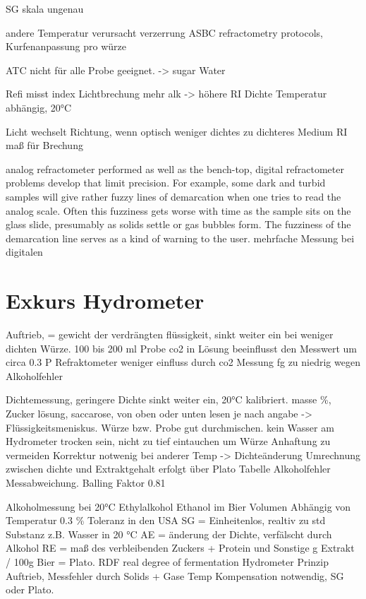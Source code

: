 \documentclass[a4paper,parskip=half]{scrartcl}
\begin{document}
SG skala ungenau
\autocite{Terrill2011}

andere Temperatur verursacht verzerrung
ASBC refractometry protocols, Kurfenanpassung pro würze
\autocite{Bonham2001}

ATC nicht
für alle Probe geeignet. -> sugar Water
\autocite{Depalma2017}

Refi misst index Lichtbrechung
mehr alk -> höhere RI
Dichte Temperatur abhängig, 20°C
\autocite{Gossett2012}

Licht wechselt Richtung, wenn optisch weniger dichtes zu dichteres Medium
RI maß für Brechung

\autocite{Spedding2016}

analog refractometer performed as well as the bench-top, digital refractometer
problems develop that limit precision.  For example, some dark and turbid samples will give rather fuzzy lines of demarcation when one tries to read the analog scale.  Often this fuzziness gets worse with time as the sample sits on the glass slide, presumably as solids settle or gas bubbles form.  The fuzziness of the demarcation line serves as a kind of warning to the user. 
mehrfache Messung bei digitalen
\autocite{Gossett2012a}

\section*{Exkurs Hydrometer}

Auftrieb, = gewicht der verdrängten flüssigkeit, sinkt weiter
ein bei weniger dichten Würze.
100 bis 200 ml Probe
co2 in Lösung beeinflusst den Messwert um circa 0.3 P
Refraktometer weniger einfluss durch co2
Messung fg zu niedrig wegen Alkoholfehler
\autocite{Novotny2017}

Dichtemessung, geringere Dichte sinkt weiter ein, 20°C kalibriert.
masse \%, Zucker lösung, saccarose, von oben oder unten lesen je
nach angabe -> Flüssigkeitsmeniskus.
Würze bzw. Probe gut durchmischen. kein Wasser am Hydrometer trocken
sein, nicht zu tief eintauchen um Würze Anhaftung zu vermeiden
Korrektur notwenig bei anderer Temp -> Dichteänderung
Umrechnung zwischen dichte und Extraktgehalt erfolgt über Plato Tabelle
Alkoholfehler Messabweichung.
Balling Faktor 0.81
\autocite{Kunze2004}

Alkoholmessung bei 20°C Ethylalkohol Ethanol im Bier
Volumen Abhängig von Temperatur
0.3 \% Toleranz in den USA
SG = Einheitenlos, realtiv zu std Substanz z.B. Wasser in 20 °C
AE = änderung der Dichte, verfälscht durch Alkohol
RE = maß des verbleibenden Zuckers + Protein und Sonstige
g Extrakt / 100g Bier = Plato.
RDF real degree of fermentation
Hydrometer Prinzip Auftrieb, Messfehler durch Solids + Gase
Temp Kompensation notwendig,
SG oder Plato. 
\autocite{Spedding2016}
\end{document}
